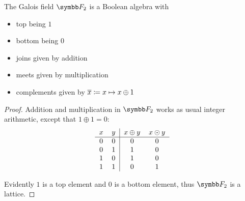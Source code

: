 \begin{theorem}\label{thm:f2_is_boolean_algebra}
  The Galois field \( \F_2 \) is a Boolean algebra with
  \begin{itemize}
    \item top being \( 1 \)
    \item bottom being \( 0 \)
    \item joins given by addition
    \item meets given by multiplication
    \item complements given by \( \overline{x} \coloneqq x \mapsto x \oplus 1 \)
  \end{itemize}
\end{theorem}
\begin{proof}
  Addition and multiplication in \( \F_2 \) works as usual integer arithmetic, except that \( 1 \oplus 1 = 0 \):
  \begin{equation*}
    \begin{tabular}{c c | c c}
      \( x \)    & \( y \)    & \( x \oplus y \) & \( x \odot y \) \\
      \hline
      \( 0 \)    & \( 0 \)    & \( 0 \)          & \( 0 \) \\
      \( 0 \)    & \( 1 \)    & \( 1 \)          & \( 0 \) \\
      \( 1 \)    & \( 0 \)    & \( 1 \)          & \( 0 \) \\
      \( 1 \)    & \( 1 \)    & \( 0 \)          & \( 1 \)
    \end{tabular}
  \end{equation*}

  Evidently \( 1 \) is a top element and \( 0 \) is a bottom element, thus \( \F_2 \) is a lattice.


\end{proof}
